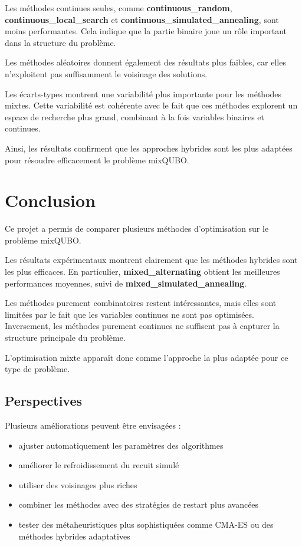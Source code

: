 \documentclass[a4paper,11pt]{article}
\begin{document}
Les méthodes continues seules, comme \textbf{continuous\_random}, \textbf{continuous\_local\_search} et \textbf{continuous\_simulated\_annealing}, sont moins performantes. 
Cela indique que la partie binaire joue un rôle important dans la structure du problème.

Les méthodes aléatoires donnent également des résultats plus faibles, car elles n'exploitent pas suffisamment le voisinage des solutions.

Les écarts-types montrent une variabilité plus importante pour les méthodes mixtes. 
Cette variabilité est cohérente avec le fait que ces méthodes explorent un espace de recherche plus grand, combinant à la fois variables binaires et continues.

Ainsi, les résultats confirment que les approches hybrides sont les plus adaptées pour résoudre efficacement le problème mixQUBO.

\section{Conclusion}

Ce projet a permis de comparer plusieurs méthodes d'optimisation sur le problème mixQUBO.

Les résultats expérimentaux montrent clairement que les méthodes hybrides sont les plus efficaces. 
En particulier, \textbf{mixed\_alternating} obtient les meilleures performances moyennes, suivi de \textbf{mixed\_simulated\_annealing}.

Les méthodes purement combinatoires restent intéressantes, mais elles sont limitées par le fait que les variables continues ne sont pas optimisées. 
Inversement, les méthodes purement continues ne suffisent pas à capturer la structure principale du problème.

L'optimisation mixte apparaît donc comme l'approche la plus adaptée pour ce type de problème.

\subsection{Perspectives}

Plusieurs améliorations peuvent être envisagées :
\begin{itemize}
    \item ajuster automatiquement les paramètres des algorithmes
    \item améliorer le refroidissement du recuit simulé
    \item utiliser des voisinages plus riches
    \item combiner les méthodes avec des stratégies de restart plus avancées
    \item tester des métaheuristiques plus sophistiquées comme CMA-ES ou des méthodes hybrides adaptatives
\end{itemize}
\end{document}
